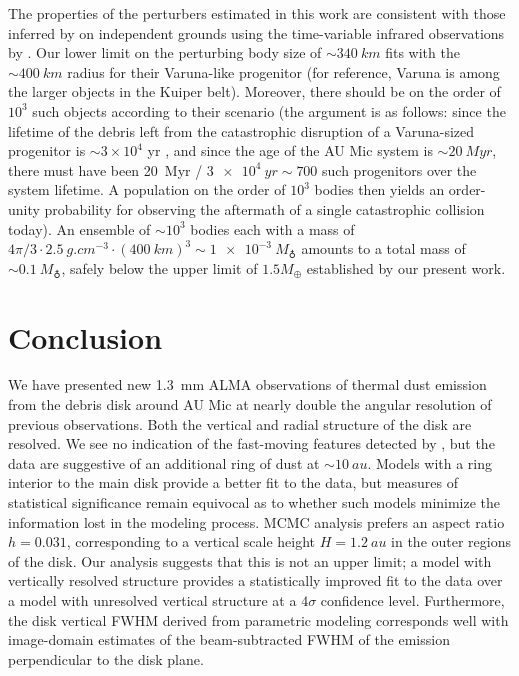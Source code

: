 \documentclass[modern]{aastex62}
\begin{document}
The properties of the perturbers estimated in this work are consistent with those inferred by \citet{chiang&fung17} on independent grounds using the time-variable infrared observations by \citet{boccaletti15,boccaletti18}. 
Our lower limit on the perturbing body size of $\sim \SI{340}{km}$ fits with the $\sim \SI{400}{km}$ radius for their Varuna-like progenitor (for reference, Varuna is among the larger objects in the Kuiper belt). 
Moreover, there should be on the order of $10^3$ such objects according to their scenario (the argument is as follows: since the lifetime of the debris left from the catastrophic disruption of a Varuna-sized progenitor is $\sim$$3 \times 10^4$ yr \citep[][their equation 21]{chiang&fung17}, and since the age of the AU Mic system is $\sim \SI{20}{Myr}$, there must have been \SI{20}{Myr} / $ \SI{3e4}{yr} \sim 700$ such progenitors over the system lifetime. 
A population on the order of $10^3$ bodies then yields an order-unity probability for observing the aftermath of a single catastrophic collision today). 
An ensemble of $\sim 10^3$ bodies each with a mass of $4\pi/3 \cdot \SI{2.5}{g.cm^{-3}} \cdot (\SI{400}{km})^3 \sim \SI{1e-3}{M_\earth}$ amounts to a total mass of $\sim \SI{0.1}{M_\earth}$, safely below the upper limit of $1.5 M_\oplus$ established by our present work.

\section{Conclusion}
\label{section: conclusion}

We have presented new \SI{1.3}{mm} ALMA observations of thermal dust emission from the debris disk around AU Mic at nearly double the angular resolution of previous observations. 
Both the vertical and radial structure of the disk are resolved.
We see no indication of the fast-moving features detected by \citet{boccaletti15}, but the data are suggestive of an additional ring of dust at $\sim \SI{10}{au}$.
Models with a ring interior to the main disk provide a better fit to the data, but measures of statistical significance remain equivocal as to whether such models minimize the information lost in the modeling process.
MCMC analysis prefers an aspect ratio $h = 0.031$, corresponding to a vertical scale height $H = \SI{1.2}{au}$ in the outer regions of the disk.
Our analysis suggests that this is not an upper limit; a model with vertically resolved structure provides a statistically improved fit to the data over a model with unresolved vertical structure at a $4 \sigma$ confidence level.
Furthermore, the disk vertical FWHM derived from parametric modeling corresponds well with image-domain estimates of the beam-subtracted FWHM of the emission perpendicular to the disk plane.
\end{document}
